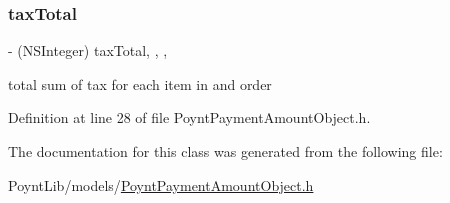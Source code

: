 \subsubsection{\texorpdfstring{tax\+Total}{taxTotal}}
{\footnotesize\ttfamily -\/ (N\+S\+Integer) tax\+Total\hspace{0.3cm}{\ttfamily [read]}, {\ttfamily [write]}, {\ttfamily [nonatomic]}, {\ttfamily [assign]}}



total sum of tax for each item in and order 



Definition at line 28 of file Poynt\+Payment\+Amount\+Object.\+h.



The documentation for this class was generated from the following file\+:\begin{DoxyCompactItemize}
\item 
Poynt\+Lib/models/\hyperlink{_poynt_payment_amount_object_8h}{Poynt\+Payment\+Amount\+Object.\+h}\end{DoxyCompactItemize}
